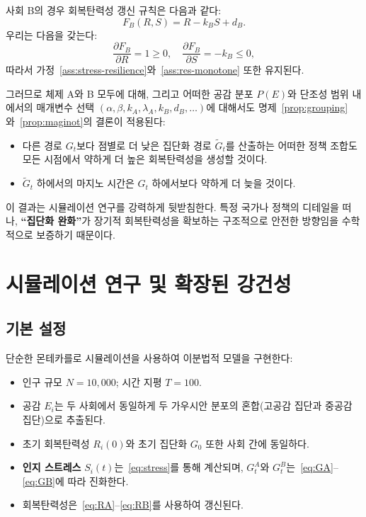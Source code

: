 \documentclass[11pt]{article}
\theoremstyle{plain}
\begin{document}
사회 B의 경우 회복탄력성 갱신 규칙은 다음과 같다:
\[
F_B(R,S) = R - k_B S + d_B.
\]
우리는 다음을 갖는다:
\[
\frac{\partial F_B}{\partial R} = 1 \ge 0, \quad
\frac{\partial F_B}{\partial S} = -k_B \le 0,
\]
따라서 가정~\ref{ass:stress-resilience}와~\ref{ass:res-monotone} 또한 유지된다.

그러므로 체제 A와 B 모두에 대해, 그리고 어떠한 공감 분포 $P(E)$와 단조성 범위 내에서의 매개변수 선택 $(\alpha,\beta,k_A,\lambda_A,k_B,d_B,\dots)$에 대해서도 명제~\ref{prop:grouping}와~\ref{prop:maginot}의 결론이 적용된다:
\begin{itemize}
  \item 다른 경로 $G_t$보다 점별로 더 낮은 집단화 경로 $\tilde{G}_t$를 산출하는 어떠한 정책 조합도 모든 시점에서 약하게 더 높은 회복탄력성을 생성할 것이다.
  \item $\tilde{G}_t$ 하에서의 마지노 시간은 $G_t$ 하에서보다 약하게 더 늦을 것이다.
\end{itemize}

이 결과는 시뮬레이션 연구를 강력하게 뒷받침한다.
특정 국가나 정책의 디테일을 떠나, \textbf{``집단화 완화''}가 장기적 회복탄력성을 확보하는 구조적으로 안전한 방향임을 수학적으로 보증하기 때문이다.

\section{시뮬레이션 연구 및 확장된 강건성}
\label{sec:simulation}

\subsection{기본 설정}

단순한 몬테카를로 시뮬레이션을 사용하여 이분법적 모델을 구현한다:
\begin{itemize}
  \item 인구 규모 $N = 10{,}000$; 시간 지평 $T = 100$.
  \item 공감 $E_i$는 두 사회에서 동일하게 두 가우시안 분포의 혼합(고공감 집단과 중공감 집단)으로 추출된다.
  \item 초기 회복탄력성 $R_i(0)$와 초기 집단화 $G_0$ 또한 사회 간에 동일하다.
  \item \textbf{인지 스트레스} $S_i(t)$는~\eqref{eq:stress}를 통해 계산되며, $G_t^A$와 $G_t^B$는~\eqref{eq:GA}--\eqref{eq:GB}에 따라 진화한다.
  \item 회복탄력성은~\eqref{eq:RA}--\eqref{eq:RB}를 사용하여 갱신된다.
\end{itemize}
\end{document}
